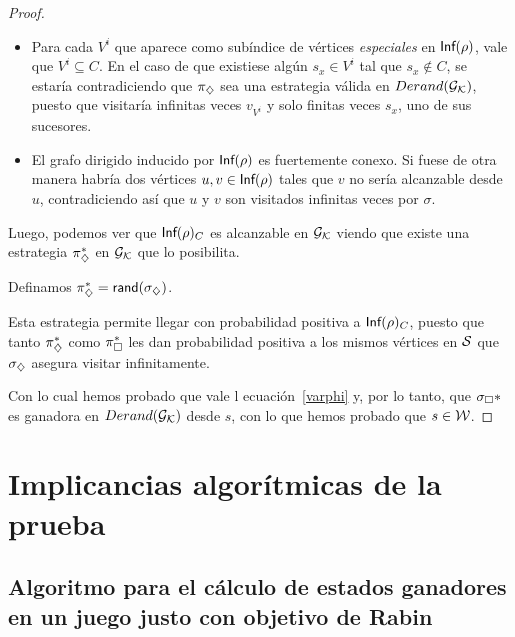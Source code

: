 \begin{proof}

	\begin{itemize}
		\item Para cada $V^i$ que aparece como subíndice de vértices \textit{especiales} en
		      $\textsf{Inf}(\rho)$, vale que $V^i \subseteq C$. En el caso de que existiese algún
		      $s_x \in V^i$ tal que $s_x \notin C$, se estaría contradiciendo que $\pi_\diamondsuit$
		      sea una estrategia válida en $Derand(\mathcal{G}_{\mathcal{K}})$, puesto que visitaría infinitas veces
		      $v_{V^i}$ y solo finitas veces $s_x$, uno de sus sucesores.
		\item El grafo dirigido inducido por $\textsf{Inf}(\rho)$ es fuertemente conexo. Si fuese de
		      otra manera habría dos vértices $u, v \in \textsf{Inf}(\rho)$ tales que $v$ no sería
		      alcanzable desde $u$, contradiciendo así que $u$ y $v$ son visitados infinitas
		      veces por $\sigma$.
	\end{itemize}

	Luego, podemos ver que $\textsf{Inf}(\rho)_C$ es alcanzable en $\mathcal{G}_{\mathcal{K}}$ viendo que existe
	una estrategia $\pi_\diamondsuit^*$ en $\mathcal{G}_{\mathcal{K}}$ que lo posibilita.

	Definamos $\pi_\diamondsuit^* = \textsf{rand}(\sigma_\diamondsuit)$.

	Esta estrategia permite llegar con probabilidad positiva a $\textsf{Inf}(\rho)_C$,
	puesto que tanto $\pi_\diamondsuit^*$ como $\pi_\square^*$ les dan probabilidad positiva a
	los mismos vértices en $\mathcal{S}$ que $\sigma_\diamondsuit$ asegura visitar infinitamente.

	Con lo cual hemos probado que vale l ecuación~\ref{varphi} y, por lo tanto, que
	$\sigma_\square*$ es ganadora en $Derand(\mathcal{G}_{\mathcal{K}})$ desde $s$, con lo que hemos probado que
	$s \in \mathcal{W}$.

\end{proof}

\section{Implicancias algorítmicas de la prueba}

\subsection*{Algoritmo para el cálculo de estados ganadores en un juego justo con objetivo de Rabin}

